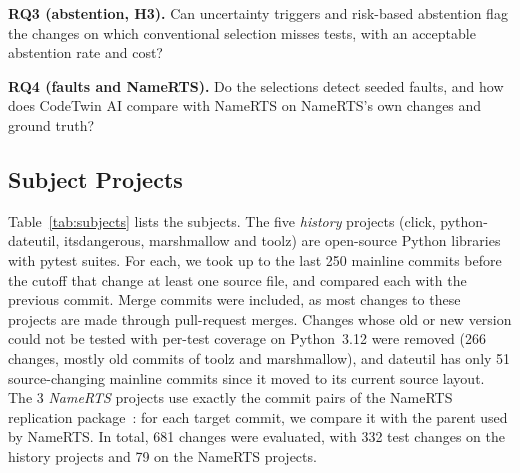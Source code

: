 \documentclass[conference]{IEEEtran}
\begin{document}
\textbf{RQ3 (abstention, H3).} Can uncertainty triggers and risk-based abstention flag the changes on which conventional selection misses tests, with an acceptable abstention rate and cost?

\textbf{RQ4 (faults and NameRTS).} Do the selections detect seeded faults, and how does CodeTwin AI compare with NameRTS on NameRTS's own changes and ground truth?

\subsection{Subject Projects}
Table~\ref{tab:subjects} lists the subjects. The five \emph{history} projects (click, python-dateutil, itsdangerous, marshmallow and toolz) are open-source Python libraries with pytest suites. For each, we took up to the last 250 mainline commits before the cutoff that change at least one source file, and compared each with the previous commit. Merge commits were included, as most changes to these projects are made through pull-request merges. Changes whose old or new version could not be tested with per-test coverage on Python~3.12 were removed (266 changes, mostly old commits of toolz and marshmallow), and dateutil has only 51 source-changing mainline commits since it moved to its current source layout. The 3 \emph{NameRTS} projects use exactly the commit pairs of the NameRTS replication package~\cite{wang2026namerts}: for each target commit, we compare it with the parent used by NameRTS. In total, 681 changes were evaluated, with 332 test changes on the history projects and 79 on the NameRTS projects.
\end{document}
